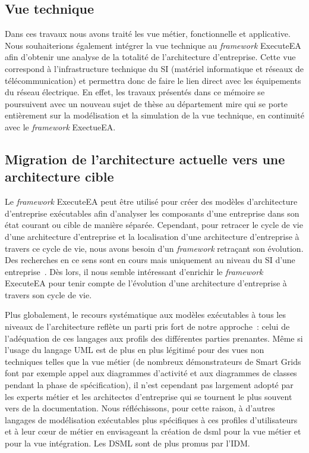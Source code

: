 \subsection{Vue technique}

    Dans ces travaux nous avons traité les vue métier, fonctionnelle et applicative. Nous souhaiterions également
    intégrer la vue technique au \emph{framework} ExecuteEA afin d'obtenir une analyse de la totalité de
    l'architecture d'entreprise. Cette vue correspond à l'infrastructure technique du SI
    (matériel informatique et réseaux de télécommunication) et permettra donc de faire le lien direct avec les équipements
    du réseau électrique. En effet, les travaux présentés dans ce mémoire se poursuivent avec un nouveau sujet de thèse
    au département \gls{mire} qui se porte entièrement sur la modélisation et la simulation de la vue technique, en continuité
    avec le \emph{framework} ExectueEA.

\subsection{Migration de l'architecture actuelle vers une architecture cible}

    Le \emph{framework} ExecuteEA peut être utilisé pour créer des modèles d'architecture d'entreprise exécutables
    afin d'analyser les composants d'une entreprise dans son état courant ou cible de manière séparée. 
    Cependant, pour retracer le cycle de vie d'une architecture d'entreprise et la localisation d'une architecture d'entreprise à
    travers ce cycle de vie, nous avons besoin d'un \emph{framework} retraçant son évolution. Des recherches en ce sens sont en cours
    mais uniquement au niveau du SI d'une entreprise~\cite{metrailler_evolis_2014}. Dès lors, il nous semble intéressant d'enrichir le
    \emph{framework} ExecuteEA pour tenir compte de l'évolution d'une architecture d'entreprise à travers son cycle de vie.

Plus globalement, le recours systématique aux modèles exécutables à tous les
niveaux de l'architecture reflète un parti pris fort de notre approche~: celui de l'adéquation de ces langages aux profils des
différentes parties prenantes. Même si l'usage du langage UML est de plus en plus
légitimé pour des vues non techniques telles que la vue métier (de nombreux démonstrateurs de Smart Grids font par exemple appel aux diagrammes d'activité et aux diagrammes de classes pendant la phase de spécification), il n'est
cependant pas largement adopté par les experts métier et les architectes d'entreprise qui se tournent
le plus souvent vers de la documentation. Nous réfléchissons, pour cette raison, à d'autres
langages de modélisation exécutables plus spécifiques à ces profiles d'utilisateurs et à leur cœur de métier
en envisageant la création de \gls{dsml} pour la vue métier et pour la vue intégration. Les DSML sont de plus promus par l'IDM.

